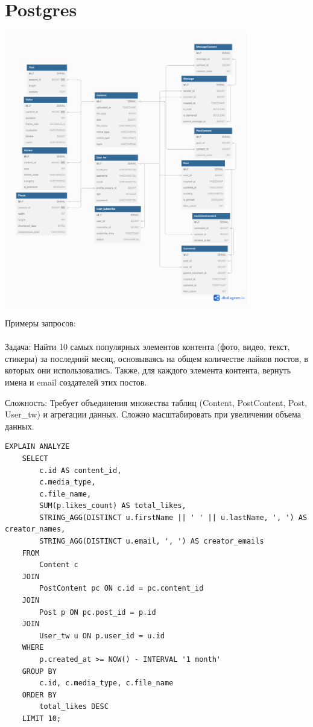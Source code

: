 \documentclass{article}
\begin{document}
\section*{Postgres}
\begin{center}
    \includegraphics[width=0.8\textwidth]{postgres.png}
\end{center}

Примеры запросов:
\\ \\
Задача: Найти 10 самых популярных элементов контента (фото, видео, текст, стикеры) за последний месяц, 
основываясь на общем количестве лайков постов, в которых они использовались. 
Также, для каждого элемента контента, вернуть имена и email создателей этих постов.

Сложность: Требует объединения множества таблиц (Content, PostContent, Post, User\_tw) и агрегации данных. 
Сложно масштабировать при увеличении объема данных.

\begin{lstlisting}[caption={TOP10}, label={lst:example}]
    EXPLAIN ANALYZE
    SELECT
        c.id AS content_id,
        c.media_type,
        c.file_name,
        SUM(p.likes_count) AS total_likes,
        STRING_AGG(DISTINCT u.firstName || ' ' || u.lastName, ', ') AS creator_names,
        STRING_AGG(DISTINCT u.email, ', ') AS creator_emails
    FROM
        Content c
    JOIN
        PostContent pc ON c.id = pc.content_id
    JOIN
        Post p ON pc.post_id = p.id
    JOIN
        User_tw u ON p.user_id = u.id
    WHERE
        p.created_at >= NOW() - INTERVAL '1 month'
    GROUP BY
        c.id, c.media_type, c.file_name
    ORDER BY
        total_likes DESC
    LIMIT 10;
\end{lstlisting}
\end{document}
